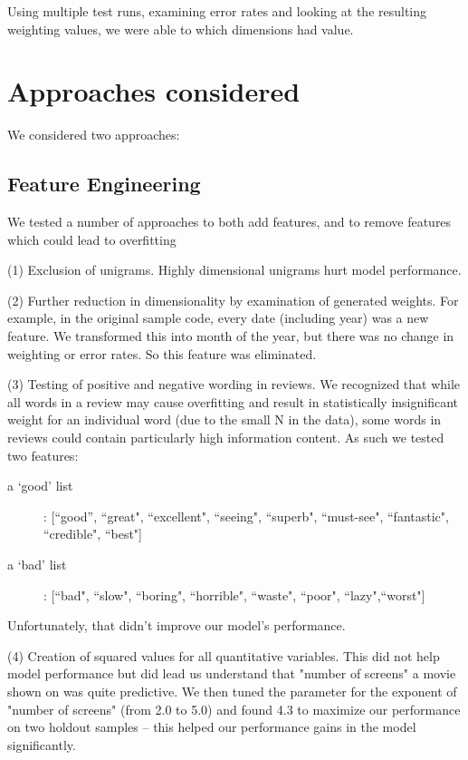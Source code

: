 \documentclass[11pt, oneside]{article}   	%
\begin{document}
Using multiple test runs, examining error rates and looking at the resulting weighting values, we were able to which dimensions had value.



\section*{Approaches considered}
We considered two approaches: 


\subsection*{Feature Engineering}
We tested a number of approaches to both add features, and to remove features which could lead to overfitting

(1) Exclusion of unigrams.  Highly dimensional unigrams hurt model performance.

(2) Further reduction in dimensionality by examination of generated weights. For example, in the original sample code, every date (including year) was a new feature. We transformed this into month of the year, but there was no change in weighting or error rates. So this feature was eliminated.

(3) Testing of positive and negative wording in reviews. We recognized that while all words in a review may cause overfitting and result in statistically insignificant weight for an individual word (due to the small N in the data), some words in reviews could contain particularly high information content. As such we tested two features:
\begin{description}
  \item[a `good' list]: [``good'', ``great", ``excellent", ``seeing", ``superb", ``must-see", ``fantastic", ``credible", ``best"]
  \item[a `bad' list]: [``bad", ``slow", ``boring", ``horrible", ``waste", ``poor", ``lazy",``worst"]
\end{description}
Unfortunately, that didn't improve our model's performance.

(4) Creation of squared values for all quantitative variables. This did not help model performance but did lead us understand that "number of screens" a movie shown on was quite predictive. We then tuned the parameter for the exponent of "number of screens" (from 2.0 to 5.0) and found 4.3 to maximize our performance on two holdout samples -- this helped our performance gains in the model significantly.
\end{document}
